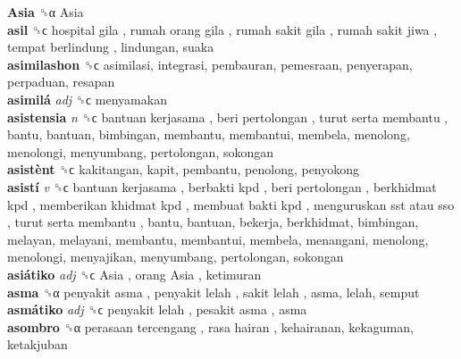 \textbf{Asia} ␝α   Asia   \\
\textbf{asil} ␝ϲ   hospital gila ,  rumah orang gila ,  rumah sakit gila ,  rumah sakit jiwa ,  tempat berlindung , lindungan, suaka  \\
\textbf{asimilashon} ␝ϲ  asimilasi, integrasi, pembauran, pemesraan, penyerapan, perpaduan, resapan  \\
\textbf{asimilá} \emph{adj}  ␝ϲ  menyamakan  \\
\textbf{asistensia} \emph{n}  ␝ϲ   bantuan kerjasama ,  beri pertolongan ,  turut serta membantu , bantu, bantuan, bimbingan, membantu, membantui, membela, menolong, menolongi, menyumbang, pertolongan, sokongan  \\
\textbf{asistènt} ␝ϲ  kakitangan, kapit, pembantu, penolong, penyokong  \\
\textbf{asistí} \emph{v}  ␝ϲ   bantuan kerjasama ,  berbakti kpd ,  beri pertolongan ,  berkhidmat kpd ,  memberikan khidmat kpd ,  membuat bakti kpd ,  menguruskan sst atau sso ,  turut serta membantu , bantu, bantuan, bekerja, berkhidmat, bimbingan, melayan, melayani, membantu, membantui, membela, menangani, menolong, menolongi, menyajikan, menyumbang, pertolongan, sokongan  \\
\textbf{asiátiko} \emph{adj}  ␝ϲ   Asia ,  orang Asia , ketimuran  \\
\textbf{asma} ␝α   penyakit asma ,  penyakit lelah ,  sakit lelah , asma, lelah, semput  \\
\textbf{asmátiko} \emph{adj}  ␝ϲ   penyakit lelah ,  pesakit asma , asma  \\
\textbf{asombro} ␝α   perasaan tercengang ,  rasa hairan , kehairanan, kekaguman, ketakjuban  \\
